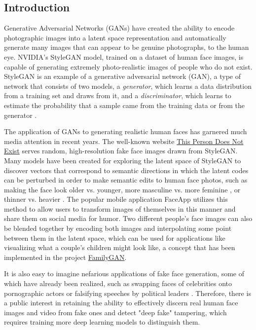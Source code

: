 \documentclass[11pt, letterpaper]{article}
\begin{document}
\begin{multicols}{2}
  \section{Introduction}

  Generative Adversarial Networks (GANs) have created the ability to encode
  photographic images into a latent space representation and automatically
  generate many images that can appear to be genuine photographs, to the human
  eye. NVIDIA's StyleGAN\cite{stylegan} model, trained on a dataset of human
  face images, is capable of generating extremely photo-realistic images of
  people who do not exist. StyleGAN is an example of a generative adversarial
  network (GAN), a type of network that consists of two models, a
  \emph{generator}, which learns a data distribution from a training set and
  draws from it, and a \emph{discriminator}, which learns to estimate the
  probability that a sample came from the training data or from the generator
  \cite{goodfellow2014generative}.

  The application of GANs to generating realistic human faces has garnered much
  media attention in recent years. The well-known website 
  \href{https://thispersondoesnotexist.com/}{This Person Does Not Exist} serves
  random, high-resolution fake face images drawn from StyleGAN. Many models have
  been created for exploring the latent space of StyleGAN to discover vectors
  that correspond to semantic directions in which the latent codes can be 
  perturbed in order to make semantic edits to human face photos, such as making
  the face look older vs. younger, more masculine vs. more feminine 
  \cite{shen2020interpreting}, or thinner vs. heavier 
  \cite{pinnimty2020transforming}. The popular mobile application FaceApp
  utilizes this method to allow users to transform images of themselves in this
  manner and share them on social media for humor. Two different people's face
  images can also be blended together by encoding both images and interpolating
  some point between them in the latent space, which can be used for applications
  like visualizing what a couple's children might look like, a concept that
  has been implemented in the project
  \href{https://medium.com/swlh/familygan-generating-a-childs-face-using-his-parents-394d8face6a4}{FamilyGAN}.

  It is also easy to imagine nefarious applications of fake face generation,
  some of which have already been realized, such as swapping faces of
  celebrities onto pornographic actors or falsifying speeches by political
  leaders \cite{nguyen2020deep}. Therefore, there is a public interest in
  retaining the ability to effectively discern real human face images and video
  from fake ones and detect "deep fake" tampering, which requires training
  more deep learning models to distinguish them.


\end{multicols}
\end{document}
